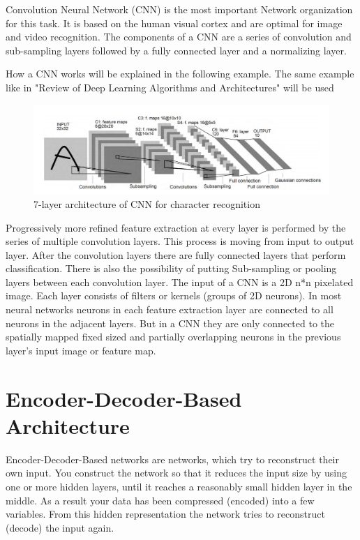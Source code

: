 Convolution Neural Network (CNN) is the most important Network organization for this task. It is based on the human visual cortex and are optimal for image and video recognition. The components of a CNN are a series of convolution and sub-sampling layers followed by a fully connected layer and a normalizing layer.

How a CNN works will be explained in the following example. The same example like in "Review of Deep Learning Algorithms and Architectures"\cite{exampleCNN} will be used
\begin{figure}[h]
	\centering
	\includegraphics[width=1.1\textwidth]{./media/images/CNN.PNG}
  	\caption{7-layer architecture of CNN for character recognition
  	\\ \cite[Fig.~4.]{exampleCNN}}
  	\label{CNN}
\end{figure}

Progressively more refined feature extraction at every layer is performed by the series of multiple convolution layers. This process is moving from input to output layer. After the convolution layers there are fully connected layers that perform classification. There is also the possibility of putting Sub-sampling or pooling layers between each convolution layer. The input of a CNN is a 2D n*n pixelated image. Each layer consists of filters or kernels (groups of 2D neurons). In most neural networks neurons in each feature extraction layer are connected to all neurons in the adjacent layers. But in a CNN they are only connected to the spatially mapped fixed sized and partially overlapping neurons in the previous layer’s input image or feature map.

\section{Encoder-Decoder-Based Architecture}

Encoder-Decoder-Based networks are networks, which try to reconstruct their own input. You construct the network so that it reduces the input size by using one or more hidden layers, until it reaches a reasonably small hidden layer in the middle. As a result your data has been compressed (encoded) into a few variables. From this hidden representation the network tries to reconstruct (decode) the input again.

